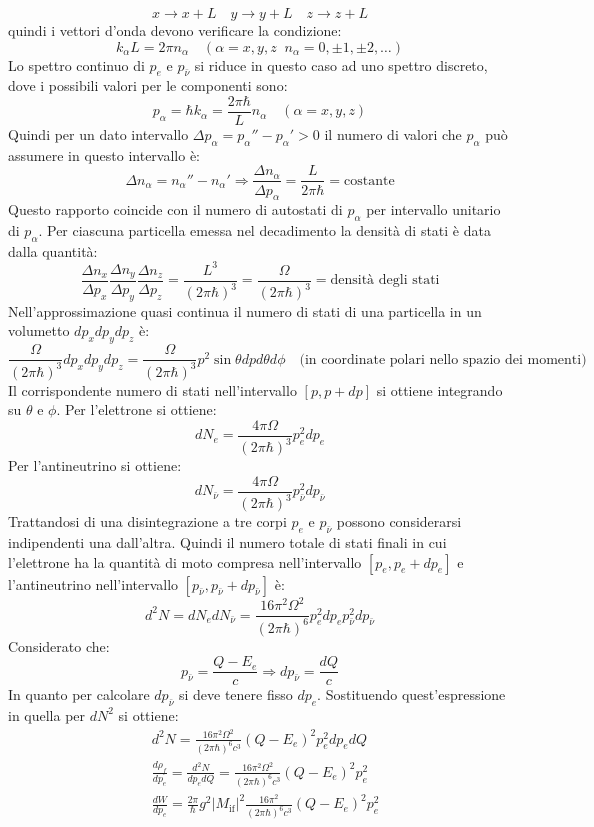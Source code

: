 \[
x\rightarrow x+L\quad y\rightarrow y+L\quad z\rightarrow z+L
\]
quindi i vettori d'onda devono verificare la condizione:
\[
k_{\alpha}L=2\pi n_{\alpha}\quad(\alpha=x,y,z\;\;n_{\alpha}=0,\pm1,\pm2,\dots)
\]
Lo spettro continuo di $p_e$ e $p_{\bar{\nu}}$ si riduce in questo caso ad uno spettro discreto, dove i possibili valori per le componenti sono:
\[
p_{\alpha}=\hbar k_{\alpha}=\frac{2\pi\hbar}{L}n_{\alpha}\quad(\alpha=x,y,z)
\]
Quindi per un dato intervallo $\Delta p_{\alpha}=p_{\alpha}''-p_{\alpha}'>0$ il numero di valori che $p_{\alpha}$ può assumere in questo intervallo è:
\[
\Delta n_{\alpha}=n_{\alpha}''-n_{\alpha}'\Rightarrow\frac{\Delta n_{\alpha}}{\Delta p_{\alpha}}=\frac{L}{2\pi\hbar}=\text{costante}
\]
Questo rapporto coincide con il numero di autostati di $p_{\alpha}$ per intervallo unitario di $p_{\alpha}$. Per ciascuna particella emessa nel decadimento la densità di stati è data
dalla quantità:
\[
\frac{\Delta n_x}{\Delta p_x}\frac{\Delta n_y}{\Delta p_y}\frac{\Delta n_z}{\Delta p_z}=\frac{L^3}{(2\pi\hbar)^3}=\frac{\Omega}{(2\pi\hbar)^3}=\text{densità degli stati}
\]
Nell'approssimazione quasi continua il numero di stati di una particella in un volumetto $dp_xdp_ydp_z$ è:
\[
\frac{\Omega}{(2\pi\hbar)^3}dp_xdp_ydp_z=\frac{\Omega}{(2\pi\hbar)^3}p^2\sin\theta dpd\theta d\phi\quad\text{(in coordinate polari nello spazio dei momenti)}
\]
Il corrispondente numero di stati nell'intervallo $[p,p+dp]$ si ottiene integrando su $\theta$ e $\phi$. Per l'elettrone si ottiene:
\[
dN_e=\frac{4\pi\Omega}{(2\pi\hbar)^3}p_e^2dp_e
\]
Per l'antineutrino si ottiene:
\[
dN_{\bar{\nu}}=\frac{4\pi\Omega}{(2\pi\hbar)^3}p^2_{\bar{\nu}}dp_{\bar{\nu}}
\]
Trattandosi di una disintegrazione a tre corpi $p_e$ e $p_{\bar{\nu}}$ possono considerarsi indipendenti una dall'altra. Quindi il numero totale di stati finali in cui l'elettrone ha la quantità
di moto compresa nell'intervallo $[p_e,p_e+dp_e]$ e l'antineutrino nell'intervallo $[p_{\bar{\nu}},p_{\bar{\nu}}+dp_{\bar{\nu}}]$ è:
\[
d^2N=dN_edN_{\bar{\nu}}=\frac{16\pi^2\Omega^2}{(2\pi\hbar)^6}p_e^2dp_ep_{\bar{\nu}}^2dp_{\bar{\nu}}
\]
Considerato che:
\[
p_{\bar{\nu}}=\frac{Q-E_e}{c}\Rightarrow dp_{\bar{\nu}}=\frac{dQ}{c}
\]
In quanto per calcolare $dp_{\bar{\nu}}$ si deve tenere fisso $dp_e$. Sostituendo quest'espressione in quella per $dN^2$ si ottiene:
\begin{align*}
&d^2N=\frac{16\pi^2\Omega^2}{(2\pi\hbar)^6c^3}(Q-E_e)^2p_e^2dp_edQ\\
&\frac{d\rho_f}{dp_e}=\frac{d^2N}{dp_edQ}=\frac{16\pi^2\Omega^2}{(2\pi\hbar)^6c^3}(Q-E_e)^2p_e^2\\
&\frac{dW}{dp_e}=\frac{2\pi}{\hbar}g^2|M_{\text{if}}|^2\frac{16\pi^2}{(2\pi\hbar)^6c^3}(Q-E_e)^2p_e^2
\end{align*}
